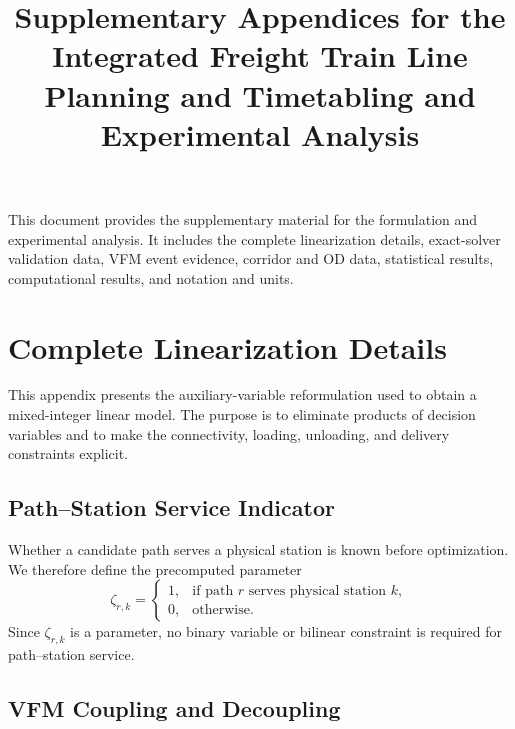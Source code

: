 \documentclass[11pt]{article}
\title{Supplementary Appendices for the Integrated Freight Train Line Planning and Timetabling and Experimental Analysis}
\author{}
\date{}
\begin{document}
\maketitle

\noindent This document provides the supplementary material for the formulation and experimental analysis. It includes the complete linearization details, exact-solver validation data, VFM event evidence, corridor and OD data, statistical results, computational results, and notation and units.

\appendix

\section{Complete Linearization Details}
\label{App:Linearization}

This appendix presents the auxiliary-variable reformulation used to obtain a mixed-integer linear model. The purpose is to eliminate products of decision variables and to make the connectivity, loading, unloading, and delivery constraints explicit.

\subsection{Path--Station Service Indicator}
\label{App:PathStation}

Whether a candidate path serves a physical station is known before optimization. We therefore define the precomputed parameter
\begin{equation}
\zeta_{r,k}=
\begin{cases}
1, & \text{if path } r \text{ serves physical station } k, \\
0, & \text{otherwise}.
\end{cases}
\label{AppEq:zeta}
\end{equation}
Since $\zeta_{r,k}$ is a parameter, no binary variable or bilinear constraint is required for path--station service.

\subsection{VFM Coupling and Decoupling}
\label{App:VFM}
\end{document}
